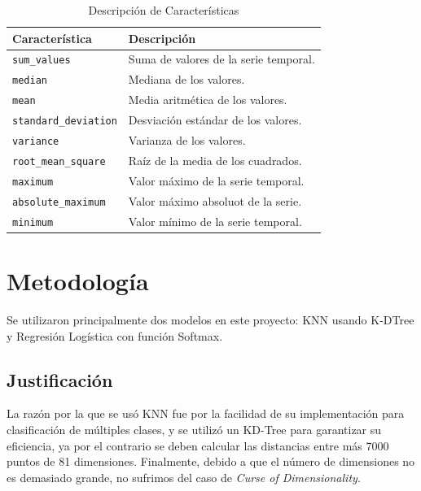 \documentclass[conference]{IEEEtran}
\begin{document}
\begin{table}[htbp]
    \caption{Descripción de Características}
    \begin{center}
        \begin{tabular}{|l|l|}
        \hline
        \textbf{Característica} & \textbf{Descripción} \\
        \hline
        \texttt{sum\_values} & Suma de valores de la serie temporal.\\
        \hline
        \texttt{median} & Mediana de los valores.\\
        \hline
        \texttt{mean} & Media aritmética de los valores.\\
        \hline
        \texttt{standard\_deviation} & Desviación estándar de los valores.\\
        \hline
        \texttt{variance} & Varianza de los valores. \\
        \hline
        \texttt{root\_mean\_square} & Raíz de la media de los cuadrados. \\
        \hline
        \texttt{maximum} & Valor máximo de la serie temporal. \\
        \hline
        \texttt{absolute\_maximum} & Valor máximo absoluot de la serie. \\
        \hline
        \texttt{minimum} & Valor mínimo de la serie temporal. \\
        \hline
        \end{tabular}
        \label{tab2}
    \end{center}
\end{table}

\section{Metodología}
Se utilizaron principalmente dos modelos en este proyecto: KNN usando K-DTree y Regresión Logística con función Softmax.

\subsection{Justificación}
La razón por la que se usó KNN fue por la facilidad de su implementación para clasificación de múltiples clases, y se utilizó un KD-Tree para garantizar su eficiencia, ya por el contrario se deben calcular las distancias entre más 7000 puntos de 81 dimensiones. Finalmente, debido a que el número de dimensiones no es demasiado grande, no sufrimos del caso de \textit{Curse of Dimensionality}.
\end{document}
